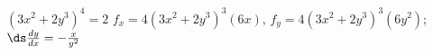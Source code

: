 {$(3x^2+2y^3)^4=2$}
{$f_x = 4(3x^2+2y^3)^3(6x)$, $f_y = 4(3x^2+2y^3)^3(6y^2)$;\\
$\ds\frac{dy}{dx} = -\frac{x}{y^2}$
}
